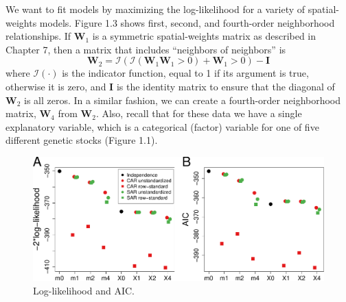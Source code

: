 \documentclass[12pt, titlepage]{article}
\begin{document}
We want to fit models by maximizing the log-likelihood for a variety of spatial-weights models. Figure 1.3 shows first, second, and fourth-order neighborhood relationships.  If $\mathbf{W}_{1}$ is a symmetric spatial-weights matrix as described in Chapter 7, then a matrix that includes ``neighbors of neighbors'' is
$$
\mathbf{W}_{2} = \mathcal{I}(\mathcal{I}(\mathbf{W}_{1}\mathbf{W}_{1} > 0) + \mathbf{W}_{1} > 0) - \mathbf{I}
$$
where $\mathcal{I}(\cdot)$ is the indicator function, equal to 1 if its argument is true, otherwise it is zero, and $\mathbf{I}$ is the identity matrix to ensure that the diagonal of $\mathbf{W}_{2}$ is all zeros.  In a similar fashion, we can create a fourth-order neighborhood matrix, $\mathbf{W}_{4}$ from $\mathbf{W}_{2}$.  Also, recall that for these data we have a single explanatory variable, which is a categorical (factor) variable for one of five different genetic stocks (Figure 1.1).

\begin{figure}[H]
  \begin{center}
	    \includegraphics[width=1\linewidth]{Seals_m2LL_AIC}
  \end{center}
  \caption{Log-likelihood and AIC.  \label{Fig:Seals_m2LLAIC}}
\end{figure}
\end{document}
